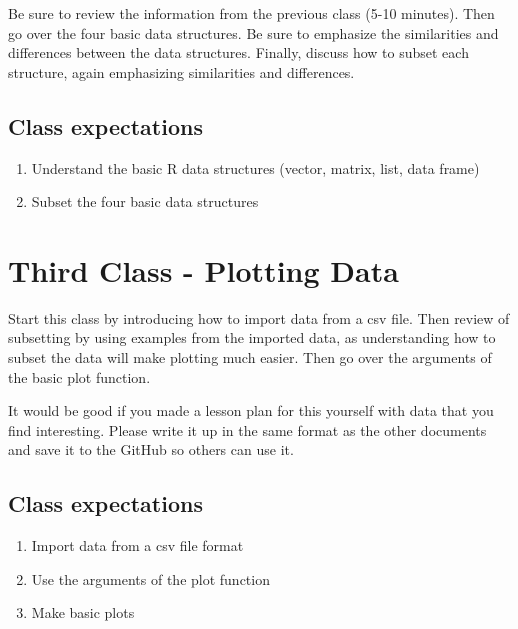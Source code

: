 \documentclass[paper=a4, fontsize=11pt]{scrartcl} %
\numberwithin{equation}{section} %
\numberwithin{figure}{section} %
\numberwithin{table}{section} %
\begin{document}
Be sure to review the information from the previous class (5-10 minutes). Then go over the four basic data structures. Be sure to emphasize the similarities and differences between the data structures. Finally, discuss how to subset each structure, again emphasizing similarities and differences. 


\subsection{Class expectations}

\begin{enumerate}
\item Understand the basic R data structures (vector, matrix, list, data frame)
\item Subset the four basic data structures 
\end{enumerate}


\section{Third Class - Plotting Data}

Start this class by introducing how to import data from a csv file. Then review of subsetting by using examples from the imported data, as understanding how to subset the data will make plotting much easier. Then go over the arguments of the basic plot function.  

It would be good if you made a lesson plan for this yourself with data that you find interesting. Please write it up in the same format as the other documents and save it to the GitHub so others can use it. 


\subsection{Class expectations}

\begin{enumerate}
\item Import data from a csv file format
\item Use the arguments of the plot function
\item Make basic plots  
\end{enumerate}
\end{document}
